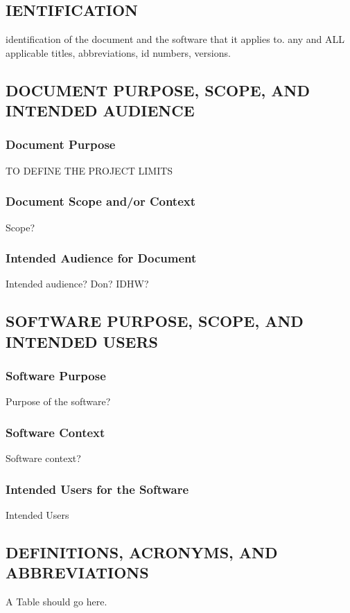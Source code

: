 \documentclass[letterpaper]{article}
\begin{document}
\subsection{IENTIFICATION}
identification of the document and the software that it applies to. any and ALL applicable titles, abbreviations, id numbers, versions.

\subsection{DOCUMENT PURPOSE, SCOPE, AND INTENDED AUDIENCE}
\subsubsection{Document Purpose}
TO DEFINE THE PROJECT LIMITS
\subsubsection{Document Scope and/or Context}
Scope?
\subsubsection{Intended Audience for Document}
Intended audience? Don? IDHW?

\subsection{SOFTWARE PURPOSE, SCOPE, AND INTENDED USERS}
\subsubsection{Software Purpose}
Purpose of the software?
\subsubsection{Software Context}
Software context?
\subsubsection{Intended Users for the Software}
Intended Users


\subsection{DEFINITIONS, ACRONYMS, AND ABBREVIATIONS}
A Table should go here.
\end{document}
